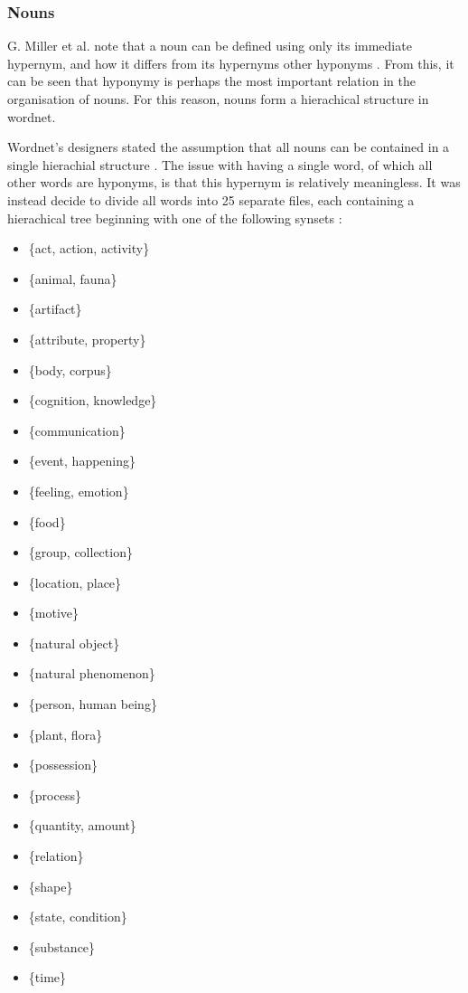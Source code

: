 \documentclass[]{article}
\begin{document}
\subsubsection{Nouns}
\label{Nouns}
G. Miller et al. note that a noun can be defined using only its immediate hypernym, and how it differs from its hypernyms other hyponyms \cite{WN2Nouns}. From this, it can be seen that hyponymy is perhaps the most important relation in the organisation of nouns. For this reason, nouns form a hierachical structure in wordnet.

Wordnet's designers stated the assumption that all nouns can be contained in a single hierachial structure \cite{WN2Nouns}. The issue with having a single word, of which all other words are hyponyms, is that this hypernym is relatively meaningless. It was instead decide to divide all words into 25 separate files, each containing a hierachical tree beginning with one of the following synsets \cite{WN2Nouns}:

\begin{multicols}{2}
\begin{itemize}
	\item[] \{act, action, activity\}
	\item[] \{animal, fauna\}
	\item[] \{artifact\}
	\item[] \{attribute, property\}
	\item[] \{body, corpus\}
	\item[] \{cognition, knowledge\}
	\item[] \{communication\}
	\item[] \{event, happening\}
	\item[] \{feeling, emotion\}
	\item[] \{food\}
	\item[] \{group, collection\}
	\item[] \{location, place\}
	\item[] \{motive\}
	\item[] \{natural object\}
	\item[] \{natural phenomenon\}
	\item[] \{person, human being\}
	\item[] \{plant, flora\}
	\item[] \{possession\}
	\item[] \{process\}
	\item[] \{quantity, amount\}
	\item[] \{relation\}
	\item[] \{shape\}
	\item[] \{state, condition\}
	\item[] \{substance\}
	\item[] \{time\}
\end{itemize}
\end{multicols}
\end{document}
